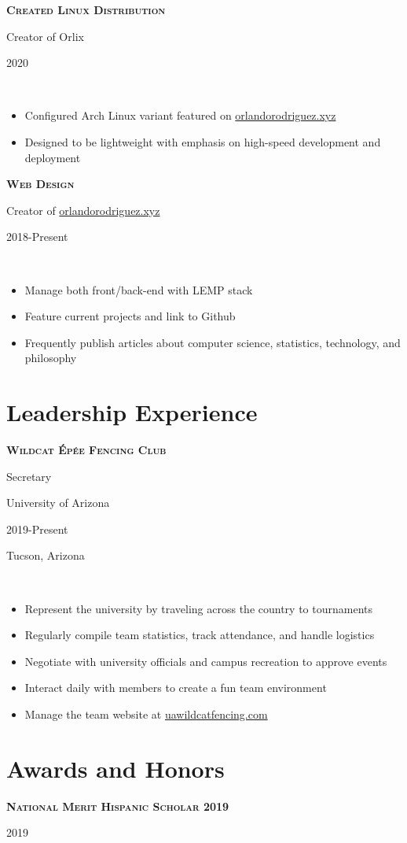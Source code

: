 \documentclass[letterpaper,10pt]{article}
\newcommand{\entry}[5]{
    \hfill\vline\hfill
    \begin{minipage}[t]{.80\textwidth}
    
        \textbf{\textsc{#3}}
        
        #4
        
        \footnotesize{#1}
    \end{minipage}
    \hfill\vline\hfill
    \begin{minipage}[t]{.15\textwidth}
        #2
        
        \footnotesize{#5}
    \end{minipage}\\\vspace{.1cm}
}
\newcommand{\ua}{University of Arizona}
\newcommand{\town}{Tucson, Arizona}
\newcommand{\site}{\href{https://www.orlandorodriguez.xyz}{orlandorodriguez.xyz}}
\newcommand{\wcfsite}{\href{https://www.uawildcatfencing.com}{uawildcatfencing.com}}
\begin{document}
\entry{}{2020}{Created Linux Distribution}{Creator of Orlix}{}
\begin{itemize}
        \item Configured Arch Linux variant featured on \site
    	\item Designed to be lightweight with emphasis on high-speed development and deployment
\end{itemize}

\entry{}{2018-Present}{Web Design}{Creator of {\site}}{}
\begin{itemize}
    \item Manage both front/back-end with LEMP stack
    \item Feature current projects and link to Github
    \item Frequently publish articles about computer science, statistics, technology, and philosophy
\end{itemize}

\section{Leadership Experience}

\entry{\ua}{2019-Present}{Wildcat Épée Fencing Club}{Secretary}{\town}
\begin{itemize}
   	\item Represent the university by traveling across the country to tournaments 
   	\item Regularly compile team statistics, track attendance, and handle logistics
    \item Negotiate with university officials and campus recreation to approve events
    \item Interact daily with members to create a fun team environment 
	\item Manage the team website at \wcfsite
\end{itemize}

\section{Awards and Honors}

\entry{}{2019}{National Merit Hispanic Scholar 2019}{}{}
\end{document}
